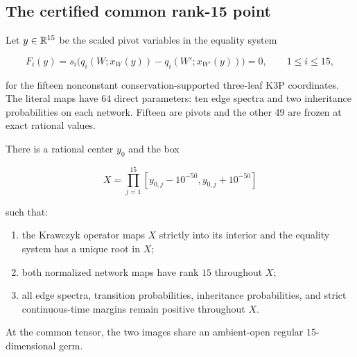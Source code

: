 \subsection{The certified common rank-15 point}

Let \(y\in\mathbb R^{15}\) be the scaled pivot variables in the equality system

\[
 F_i(y)=s_i\bigl(q_i(W;x_W(y))-q_i(W';x_{W'}(y))\bigr)=0,
 \qquad 1\le i\le15,
\]

for the fifteen nonconstant conservation-supported three-leaf K3P
coordinates.  The literal maps have 64 direct parameters: ten edge
spectra and two inheritance probabilities on each network.  Fifteen are
pivots and the other 49 are frozen at exact rational values.

\begin{proposition}\label{prop:krawczyk}
There is a rational center \(y_0\) and the box

\[
 X=\prod_{j=1}^{15}[y_{0,j}-10^{-50},y_{0,j}+10^{-50}]
\]

such that:

\begin{enumerate}[label=(\roman*)]
  \item the Krawczyk operator maps \(X\) strictly into its interior and the
        equality system has a unique root in \(X\);
  \item both normalized network maps have rank \(15\) throughout \(X\);
  \item all edge spectra, transition probabilities, inheritance
        probabilities, and strict continuous-time margins remain positive
        throughout \(X\).
\end{enumerate}

At the common tensor, the two images share an ambient-open regular
\(15\)-dimensional germ.
\end{proposition}

